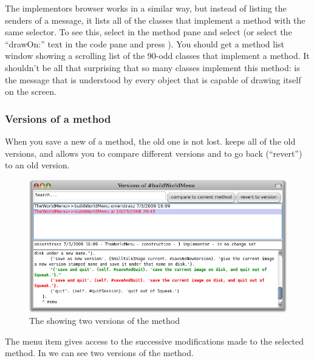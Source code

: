 \documentclass[a4paper,10pt,twoside]{book}
\begin{document}
The implementors browser works in a similar way, but instead of listing the senders of a message, it lists all of the classes that implement a method with the same selector. To see this, select  in the method pane and select  (or select the ``drawOn:'' text in the code pane and press ).
You should get a method list window showing a scrolling list of the 90-odd classes that implement a  method.
It shouldn't be all that surprising that so many classes implement this method:  is the message that is understood by every object that is capable of drawing itself on the screen.

\subsubsection{Versions of a method}

When you save a new  of a method, the old one is not lost.  \pharo keeps all of the old versions, and allows you to compare different versions and to go back (``revert'') to an old version.
\begin{figure}[btp]
   \centering
   \includegraphics[width=\textwidth]{Versions}
   \caption{The  showing two versions of the  method}
\end{figure}
The  menu item gives access to the successive modifications made to the selected method.
In  we can see two versions of the  method.
\end{document}
